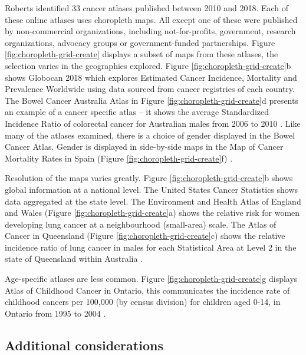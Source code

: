 \documentclass{monashthesis}
\begin{document}
Roberts \autocite{roberts2019communication} identified 33 cancer atlases published between 2010 and 2018. Each of these online atlases uses choropleth maps. All except one of these were published by non-commercial organizations, including not-for-profits, government, research organizations, advocacy groups or government-funded partnerships. Figure \ref{fig:choropleth-grid-create} displays a subset of maps from these atlases, the selection varies in the geographies explored. Figure \ref{fig:choropleth-grid-create}b shows Globocan 2018 \autocite{Globocan} which explores Estimated Cancer Incidence, Mortality and Prevalence Worldwide using data sourced from cancer registries of each country. The Bowel Cancer Australia Atlas in Figure \ref{fig:choropleth-grid-create}d presents an example of a cancer specific atlas -- it shows the average Standardized Incidence Ratio of colorectal cancer for Australian males from 2006 to 2010 \autocite{Bowel}. Like many of the atlases examined, there is a choice of gender displayed in the Bowel Cancer Atlas. Gender is displayed in side-by-side maps in the Map of Cancer Mortality Rates in Spain (Figure \ref{fig:choropleth-grid-create}f) \autocite{cancerSpain}.

Resolution of the maps varies greatly. Figure \ref{fig:choropleth-grid-create}b shows global information at a national level. The United States Cancer Statistics \autocite{USInteractive} shows data aggregated at the state level. The Environment and Health Atlas of England and Wales \autocite{EnvEnglandWales2} (Figure \ref{fig:choropleth-grid-create}a) shows the relative risk for women developing lung cancer at a neighbourhood (small-area) scale. The Atlas of Cancer in Queensland (Figure \ref{fig:choropleth-grid-create}c) shows the relative incidence ratio of lung cancer in males for each Statistical Area at Level 2 \autocite{abs2016} in the state of Queensland within Australia \autocite{QLDcancerAtlas}.

Age-specific atlases are less common. Figure \ref{fig:choropleth-grid-create}g displays Atlas of Childhood Cancer in Ontario, this communicates the incidence rate of childhood cancers per 100,000 (by census division) for children aged 0-14, in Ontario from 1995 to 2004 \autocite{OntarioPediatric}.

\hypertarget{additional-considerations}{%
\subsection{Additional considerations}\label{additional-considerations}}
\end{document}
